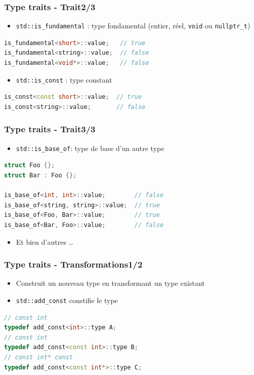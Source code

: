 \documentclass[C++.tex]{subfiles}
\begin{document}
\begin{frame}[fragile]
	\frametitle{Type traits - Trait\titlehfill{}2/3}
	\begin{itemize}
		\item \lstinline|std::is_fundamental| : type fondamental (entier, réel, \lstinline|void| ou \lstinline|nullptr_t|)
	\end{itemize}

	\begin{lstlisting}[language=C++]
is_fundamental<short>::value;   // true
is_fundamental<string>::value;  // false
is_fundamental<void*>::value;   // false\end{lstlisting}

	\begin{itemize}
		\item \lstinline|std::is_const| : type constant
	\end{itemize}

	\begin{lstlisting}[language=C++]
is_const<const short>::value;  // true
is_const<string>::value;       // false\end{lstlisting}
\end{frame}

\begin{frame}[fragile]
	\frametitle{Type traits - Trait\titlehfill{}3/3}
	\begin{itemize}
		\item \lstinline|std::is_base_of|: type de base d'un autre type
	\end{itemize}

	\begin{lstlisting}[language=C++]
struct Foo {};
struct Bar : Foo {};

is_base_of<int, int>::value;        // false
is_base_of<string, string>::value;  // true
is_base_of<Foo, Bar>::value;        // true
is_base_of<Bar, Foo>::value;        // false\end{lstlisting}

	\begin{itemize}
		\item Et bien d'autres \ldots
	\end{itemize}
\end{frame}

\begin{frame}[fragile]
	\frametitle{Type traits - Transformations\titlehfill{}1/2}
	\begin{itemize}
		\item Construit un nouveau type en transformant un type existant
		\item \lstinline|std::add_const| constifie le type
	\end{itemize}

	\begin{lstlisting}[language=C++]
// const int
typedef add_const<int>::type A;
// const int
typedef add_const<const int>::type B;
// const int* const
typedef add_const<const int*>::type C;\end{lstlisting}
\end{frame}
\end{document}

